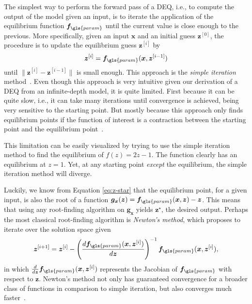 The simplest way to perform the forward pass of a \gls{DEQ}, i.e., to compute the output of the model given an input, is to iterate the application of the equilibrium function $\bm{f}_{\gls{param}}$ until the current value is close enough to the previous.
More specifically, given an input $\bm{x}$ and an initial guess $\bm{z}^{[0]}$, the procedure is to update the equilibrium guess $\bm{z}^{[i]}$ by \[
    \bm{z}^{[i]} = \bm{f}_{\gls{param}}(\bm{x}, \bm{z}^{[i-1]})
\] until $\|\bm{z}^{[i]}-\bm{z}^{[i-1]}\|$ is small enough.
This approach is the \emph{simple iteration} method~\cite{suli_introduction_2003}.
Even though this approach is very intuitive given our derivation of a \gls{DEQ} from an infinite-depth model, it is quite limited.
First because it can be quite slow, i.e., it can take many iterations until convergence is achieved, being very sensitive to the starting point.
But mostly because this approach only finds equilibrium points if the function of interest is a contraction between the starting point and the equilibrium point~\cite{suli_introduction_2003}.

This limitation can be easily visualized by trying to use the simple iteration method to find the equilibrium of $f(z) = 2z-1$.
The function clearly has an equilibrium at $z=1$.
Yet, at any starting point \emph{except} the equilibrium, the simple iteration method will diverge.

Luckily, we know from Equation \eqref{eq:z-star} that the equilibrium point, for a given input, is also the root of a function $\bm{g}_{\bm{x}}(\bm{z}) = \bm{f}_{\gls{param}}(\bm{x},\bm{z}) - \bm{z}$.
This means that using any root-finding algorithm on $\bm{g}_{\bm{x}}$ yields $\bm{z}^{\star}$, the desired output.
Perhaps the most classical root-finding algorithm is \emph{Newton's method}, which proposes to iterate over the solution space given \[
    \bm{z}^{[i+1]} = \bm{z}^{[i]} - \left( \frac{d \bm{f}_{\gls{param}}(\bm{x},\bm{z}^{[i]})}{d\bm{z}}  \right)^{-1} \bm{f}_{\gls{param}}(\bm{x},\bm{z}^{[i]})
,\] 
in which $\frac{d} {d\bm{z}} \bm{f}_{\gls{param}}(\bm{x},\bm{z}^{[i]})$ represents the Jacobian of  $\bm{f}_{\gls{param}}$ with respect to $\bm{z}$\footnotemark.
Newton's method not only has guaranteed convergence for a broader class of functions in comparison to simple iteration, but also converges much faster~\cite{suli_introduction_2003}.

